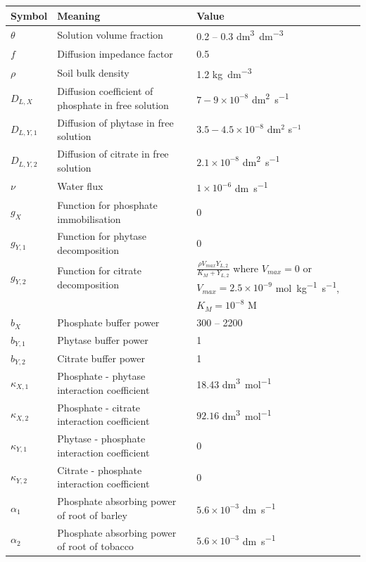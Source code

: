 \documentclass[11pt]{article}
\numberwithin{equation}{section}
\begin{document}
\begin{table}[!htb]
\begin{center}
\fontsize{9.5}{7}\selectfont
\setlength{\tabcolsep}{5.pt}
\def\arraystretch{1.5}
\begin{tabular}{lll}
\toprule
    \bf Symbol & \multicolumn{1}{l}{\bf Meaning} & \bf Value
    \\ \midrule
    $\theta$ & Solution volume fraction & 0.2 -- 0.3 \si{dm^3.dm^{-3}} \\
    $f$ & Diffusion impedance factor & 0.5 \\ 
    $\rho$ & Soil bulk density & 1.2 \si{kg.dm^{-3}} \\
    $D_{L,X} $ & Diffusion coefficient of phosphate in free solution & $7-9 \times 10^{-8}$ \si{dm^2 . s^{-1}} \\  
	$D_{L,Y,1}$ &  Diffusion of phytase in free solution & $3.5 - 4.5 \times 10^{-8}$ dm$^2$ s$^{-1}$ \\   
	$D_{L,Y,2}$ & Diffusion of citrate in free solution & $2.1 \times 10^{-8}$ \si{dm^2 . s^{-1}} \\
	$\nu$ & Water flux & $1 \times 10^{-6}$ \si{dm .s^{-1}}\\
	$g_X$ & Function for phosphate immobilisation & 0 \\
	$g_{Y,1}$ & Function for phytase decomposition & 0 \\
	$g_{Y,2}$ & Function for citrate decomposition & $\frac{\rho V_{max} Y_{L,2} }{K_M + Y_{L,2} }$ where $V_{max} = 0$ or $V_{max} = 2.5 \times 10^{-9}$ \si{mol.kg^{-1} .s^{-1}}, \\
	 & & $K_M=10^{-8}$ \si{M} \\
	$b_X$ & Phosphate buffer power & 300 -- 2200 \\
	$b_{Y,1}$ & Phytase buffer power & 1 \\
	$b_{Y,2}$ & Citrate buffer power & 1 \\
	$\kappa_{X,1}$ & Phosphate - phytase interaction coefficient & 18.43 \si{dm^3 . mol^{-1}} \\
	$\kappa_{X,2}$ & Phosphate - citrate interaction coefficient & $92.16$ \si{dm^3 .mol^{-1}} \\
	$\kappa_{Y,1}$ & Phytase - phosphate interaction coefficient & 0 \\
	$\kappa_{Y,2}$ & Citrate - phosphate interaction coefficient & 0 \\ 
	$\alpha_1 $ & Phosphate absorbing power of root of barley & $5.6 \times 10^{-3}$ \si{dm.s^{-1}} \\
	$\alpha_2 $ & Phosphate absorbing power of root of tobacco & $5.6 \times 10^{-3}$ \si{dm.s^{-1}} \\

\end{tabular}
\end{center}
\end{table}
\end{document}
